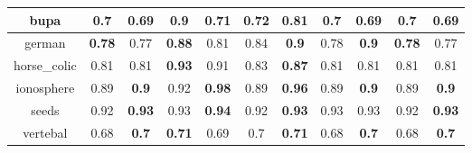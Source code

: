 \documentclass{article}%
\begin{document}
\begin{tabular}{c|cccccccccc}
\hline%
bupa&\textbf{0.7}&0.69&\textbf{0.9}&0.71&0.72&\textbf{0.81}&\textbf{0.7}&0.69&\textbf{0.7}&0.69\\%
\hline%
german&\textbf{0.78}&0.77&\textbf{0.88}&0.81&0.84&\textbf{0.9}&0.78&\textbf{0.9}&\textbf{0.78}&0.77\\%
\hline%
horse\_colic&0.81&0.81&\textbf{0.93}&0.91&0.83&\textbf{0.87}&0.81&0.81&0.81&0.81\\%
\hline%
ionosphere&0.89&\textbf{0.9}&0.92&\textbf{0.98}&0.89&\textbf{0.96}&0.89&\textbf{0.9}&0.89&\textbf{0.9}\\%
\hline%
seeds&0.92&\textbf{0.93}&0.93&\textbf{0.94}&0.92&\textbf{0.93}&0.93&0.93&0.92&\textbf{0.93}\\%
\hline%
vertebal&0.68&\textbf{0.7}&\textbf{0.71}&0.69&0.7&\textbf{0.71}&0.68&\textbf{0.7}&0.68&\textbf{0.7}\\%
\hline%
\end{tabular}

%
\end{document}
